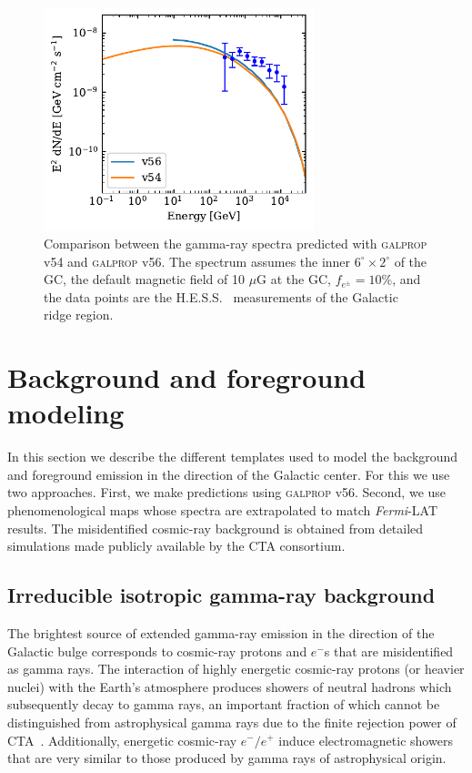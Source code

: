 \documentclass[doublespace,nopageskip]{VTthesis}
\begin{document}
\begin{figure}[htb]
    \begin{center}
    \includegraphics[width=0.7\textwidth]{Figures/CTA/compare.pdf}
    \caption{Comparison between the gamma-ray spectra predicted with \textsc{galprop} v54 and \textsc{galprop} v56. The spectrum assumes the inner $6^\circ \times 2^\circ$ of the GC, the default magnetic field of 10 $\mu$G at the GC, $f_{e^\pm}=10\%$, and the data points are the H.E.S.S.~\citep{2006Natur.439..695A} measurements of the Galactic ridge region.   }\label{fig:compareV54andV56}
    \end{center}
\end{figure}

\section{Background and foreground modeling}
\label{sec:backgroundtemplates}
In this section we describe the different templates used to model the background and foreground emission in the direction of the Galactic center. For this we use two approaches. First, we make predictions using \textsc{galprop } v56. Second, we use phenomenological maps whose spectra are extrapolated to match \textit{Fermi}-LAT results. The misidentified cosmic-ray background is obtained from detailed simulations made publicly available by the CTA consortium.

\subsection{Irreducible isotropic gamma-ray background}
The brightest source of extended gamma-ray emission in the direction of the Galactic bulge corresponds to cosmic-ray protons and $e^{-}$s that are misidentified as gamma rays. The interaction of highly energetic cosmic-ray protons (or heavier nuclei) with the Earth's atmosphere produces showers of neutral hadrons which subsequently decay to gamma rays, an important fraction of which cannot be distinguished from astrophysical gamma rays due to the finite rejection power of CTA~\citep{2021JCAP...01..057A,2021PhRvD.103b3011R}. Additionally, energetic cosmic-ray $e^{-}/e^{+}$ induce electromagnetic showers that are very similar to those produced by gamma rays of astrophysical origin. 
\end{document}
